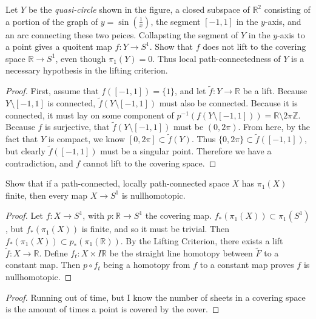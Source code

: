 \documentclass[12pt]{article}
\newenvironment{statement}[2][Statement]{\begin{trivlist}
\item[\hskip \labelsep {\bfseries #1}\hskip \labelsep {\bfseries #2.}]}{\end{trivlist}}
\begin{document}
\begin{statement}[Problem]{4}
  Let $Y$ be the \textit{quasi-circle} shown in the figure, a closed subspace of $\mathbb{R}^2$ 
  consisting of a portion of the graph of $y = \sin(\frac{1}{x})$, the segment $[-1,1]$ in 
  the $y$-axis, and an arc connecting these two peices. Collapsting the segment of $Y$ in the $y$-axis 
  to a point gives a quoitent map $f: Y \to S^1$. Show that $f$ does not lift to the covering space 
  $\mathbb{R} \to S^1$, even though $\pi_1(Y)=0$. Thus local path-connectedness of $Y$ is a 
  necessary hypothesis in the lifting criterion. 
\end{statement}
\begin{proof}
  First, assume that $f([-1,1])=\{1\}$, and let $\tilde{f}:Y \to \mathbb{R}$ be a lift. Because $Y \setminus [-1,1]$ 
  is connected, $\tilde{f}(Y \setminus [-1,1])$ must also be connected. Because it is connected, 
  it must lay on some component of $p^{-1}(f(Y \setminus [-1,1])) = \mathbb{R} \setminus 2\pi \mathbb{Z}$.
  Because $f$ is surjective, that $\tilde{f}(Y \setminus [-1,1])$ must be $(0, 2\pi)$. 
  From here, by the fact that $Y$ is compact, we know $[0,2\pi] \subset \tilde{f}(Y)$. Thus 
  $\{0,2\pi \} \subset \tilde{f}([-1,1])$, but clearly $\tilde{f}([-1,1])$ must be a singular point. 
  Therefore we have a contradiction, and $f$ cannot lift to the covering space.
\end{proof}

\begin{statement}[Problem]{5}
  Show that if a path-connected, locally path-connected space $X$ has $\pi_1(X)$ finite, then 
  every map $X \to S^1$ is nullhomotopic. 
\end{statement}
\begin{proof}
  Let $f: X \to S^1$, with $p: \mathbb{R} \to S^1$ the covering map. $f_*(\pi_1(X)) \subset \pi_1(S^1)$, but 
  $f_*(\pi_1(X))$ is finite, and so it must be trivial. Then $f_*(\pi_1(X)) \subset p_*(\pi_1(\mathbb{R}))$.
  By the Lifting Criterion, there exists a lift $\tilde{f}:X \to \mathbb{R}$. Define 
  $f_t: X \times I \mathbb{R}$ be the straight line homotopy between $\tilde{F}$ to a constant map. 
  Then $p \circ f_t$ being a homotopy from $f$ to a constant map proves $f$ is nullhomotopic.
\end{proof}

\begin{statement}[Problem]{6}

\end{statement}
\begin{proof}
  Running out of time, but I know the number of sheets in a covering space is the amount of times a point is 
  covered by the cover. 
\end{proof}
\end{document}
